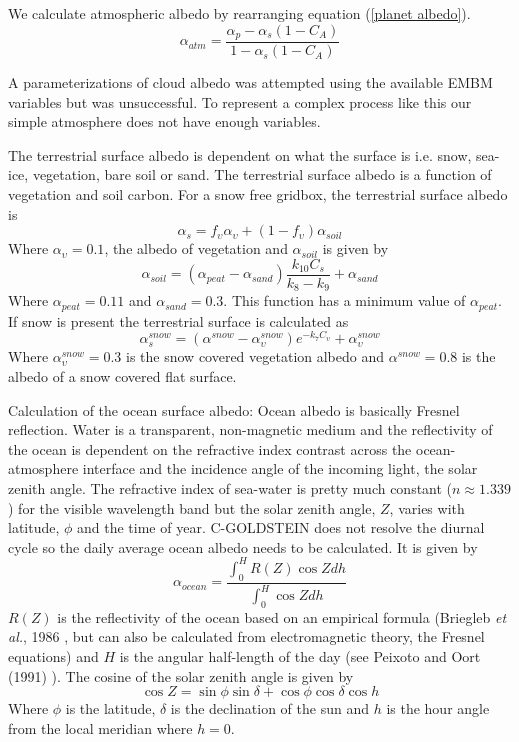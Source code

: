 \documentclass[10pt,a4paper]{report}
\begin{document}
We calculate atmospheric albedo by rearranging equation (\ref{planet
albedo}).
\begin{equation}
\alpha_{atm}=\frac{\alpha_p - \alpha_s(1-C_A)}{1 - \alpha_s(1-C_A)}
\end{equation}

A parameterizations of cloud albedo was attempted using the
available EMBM variables but was unsuccessful. To represent a
complex process like this our simple atmosphere does not have enough
variables.

The terrestrial surface albedo is dependent on what the surface is
i.e. snow, sea-ice, vegetation, bare soil or sand. The terrestrial
surface albedo is a function of vegetation and soil carbon. For a
snow free gridbox, the terrestrial surface albedo is
\begin{equation}
\alpha_s=f_{\upsilon}\alpha_{\upsilon} +
(1-f_{\upsilon})\alpha_{soil}
\end{equation}
Where $\alpha_{\upsilon}=0.1$, the albedo of vegetation and
$\alpha_{soil}$ is given by
\begin{equation}
\alpha_{soil}=(\alpha_{peat}-\alpha_{sand})\frac{k_{10}C_s}{k_8-k_9}+\alpha_{sand}
\end{equation}
Where $\alpha_{peat}=0.11$ and $\alpha_{sand}=0.3$. This function
has a minimum value of $\alpha_{peat}$. If snow is present the
terrestrial surface is calculated as
\begin{equation}
\alpha_s^{snow}=(\alpha^{snow}-\alpha_{\upsilon}^{snow})e^{-k_7
C_{\upsilon}}+\alpha_{\upsilon}^{snow}
\end{equation}
Where $\alpha_{\upsilon}^{snow}=0.3$ is the snow covered
vegetation albedo and $\alpha^{snow}=0.8$ is the albedo of a snow
covered flat surface.

Calculation of the ocean surface albedo: Ocean albedo is basically
Fresnel reflection. Water is a transparent, non-magnetic medium and
the reflectivity of the ocean is dependent on the refractive index
contrast across the ocean-atmosphere interface and the incidence
angle of the incoming light, the solar zenith angle. The refractive
index of sea-water is pretty much constant ($n\approx 1.339$) for
the visible wavelength band but the solar zenith angle, $Z$, varies
with latitude, $\phi$ and the time of year. C-GOLDSTEIN does not
resolve the diurnal cycle so the daily average ocean albedo needs to
be calculated. It is given by
\begin{equation}
\alpha_{ocean}=\frac{\int^{H}_{0} R(Z) \cos Z dh}{\int^H_0 \cos Z
dh}
\end{equation}
$R(Z)$ is the reflectivity of the ocean based on an empirical
formula (Briegleb {\em et al.}, 1986 \cite{Ramanathan}, but can
also be calculated from electromagnetic theory, the Fresnel
equations) and $H$ is the angular half-length of the day (see
Peixoto and Oort (1991) \cite{P+O}). The cosine of the solar
zenith angle is given by
\begin{equation}
\cos Z = \sin \phi \sin \delta + \cos \phi \cos \delta \cos h
\end{equation}
Where $\phi$ is the latitude, $\delta$ is the declination of the
sun and $h$ is the hour angle from the local meridian where $h=0$.
\end{document}
